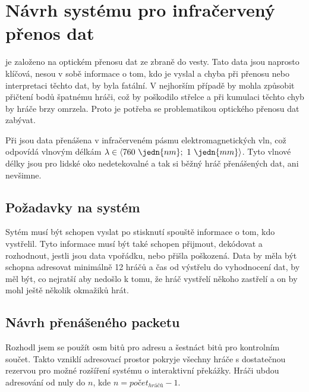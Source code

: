 \chapter{Návrh systému pro infračervený přenos dat}
 je založeno na optickém přenosu dat ze zbraně do vesty. Tato data jsou naprosto klíčová, nesou v sobě informace o tom, kdo je vyslal a chyba při přenosu nebo interpretaci těchto dat, by byla fatální. V nejhorším případě by mohla způsobit přičtení bodů špatnému hráči, což by poškodilo střelce a při kumulaci těchto chyb by  hráče brzy omrzela. Proto je potřeba se problematikou optického přenosu dat zabývat.

Při  jsou data přenášena v infračerveném pásmu elektromagnetických vln, což odpovídá vlnovým délkám $\lambda \in \langle 760~\jedn{nm};~1~\jedn{mm}\rangle$. Tyto vlnové délky jsou pro lidské oko nedetekovalné a tak si běžný hráč přenášených dat, ani nevšimne.

\section{Požadavky na systém}
Sytém musí být schopen vyslat po stisknutí spouště informace o tom, kdo vystřelil. Tyto informace musí být také schopen přijmout, dekódovat a rozhodnout, jestli jsou data vpořádku, nebo přišla poškozená. Data by měla být schopna adresovat minimálně 12 hráčů a čas od výstřelu do vyhodnocení dat, by měl být, co nejratší aby nedošlo k tomu, že hráč vystřelí někoho zastřelí a on by mohl ještě několik okmažiků hrát.

\section{Návrh přenášeného packetu}
Rozhodl jsem se použít osm bitů pro adresu a šestnáct bitů pro kontrolním součet. Takto vzniklí adresovací prostor pokryje všechny hráče s dostatečnou rezervou pro možné rozšíření systému o interaktivní překážky. Hráči ubdou adresování od nuly do $n$, kde $n = počet _{hráčů} - 1$.

